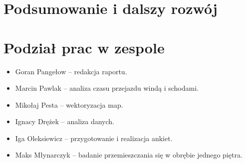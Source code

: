 \documentclass[14pt,a4paper]{extarticle}
\begin{document}
\section{Podsumowanie i dalszy rozwój}

\section{Podział prac w zespole}

\begin{itemize}
    \item Goran Pangełow -- redakcja raportu.
    \item Marcin Pawlak -- analiza czasu przejazdu windą i schodami.
    \item Mikołaj Pesta -- wektoryzacja map.
    \item Ignacy Drężek -- analiza danych.
    \item Iga Oleksiewicz -- przygotowanie i realizacja ankiet.
    \item Maks Młynarczyk -- badanie przemieszczania się w obrębie jednego piętra.
\end{itemize}
\end{document}
